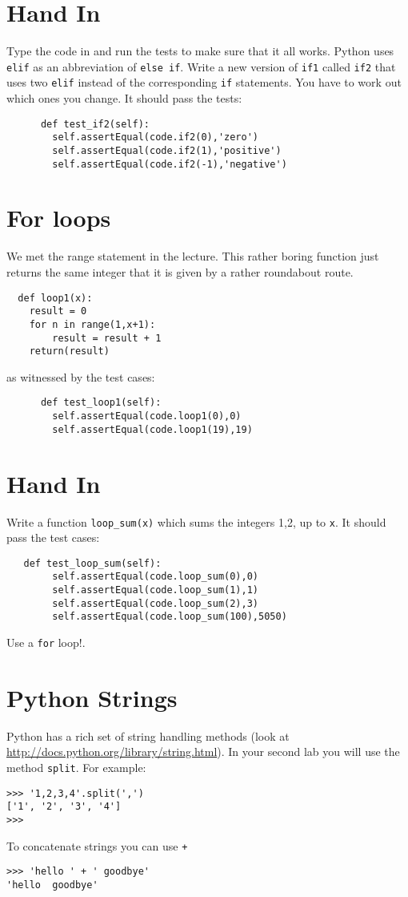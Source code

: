 \documentclass{paper}
\begin{document}
\section{Hand In}
Type the code in and run the tests to make sure that it all
works. Python uses {\tt elif} as an abbreviation of {\tt else
  if}. Write a new version of {\tt if1} called {\tt if2} that uses
two {\tt elif} instead of the corresponding {\tt if} statements. You
have to work out which ones you change. It should pass the tests:
\begin{lstlisting}
      def test_if2(self):
        self.assertEqual(code.if2(0),'zero')
        self.assertEqual(code.if2(1),'positive')
        self.assertEqual(code.if2(-1),'negative')
\end{lstlisting}

\section*{For loops}
We met the range statement in the lecture. This rather boring function
just returns the same integer that it is given by a rather roundabout
route.
\begin{lstlisting}
  def loop1(x):
    result = 0
    for n in range(1,x+1):
        result = result + 1
    return(result)
\end{lstlisting}
as witnessed by the test cases:
\begin{lstlisting}
      def test_loop1(self):
        self.assertEqual(code.loop1(0),0)
        self.assertEqual(code.loop1(19),19)
\end{lstlisting}

\section{Hand In}
Write a function {\tt loop\_sum(x)} which sums the integers 1,2, up to
{\tt x}. It should pass the test cases:
\begin{lstlisting}
   def test_loop_sum(self):
        self.assertEqual(code.loop_sum(0),0)
        self.assertEqual(code.loop_sum(1),1)
        self.assertEqual(code.loop_sum(2),3)
        self.assertEqual(code.loop_sum(100),5050)
\end{lstlisting}
Use a {\tt for} loop!.

\section*{Python Strings}

Python has a rich set of string handling methods (look at \url{http://docs.python.org/library/string.html}). In your second lab
you will use the  method {\tt split}. For example:
\begin{verbatim}
>>> '1,2,3,4'.split(',')
['1', '2', '3', '4']
>>>
\end{verbatim}
To concatenate strings you can use {\tt +}
\begin{verbatim}
>>> 'hello ' + ' goodbye'
'hello  goodbye'
\end{verbatim}
\end{document}
